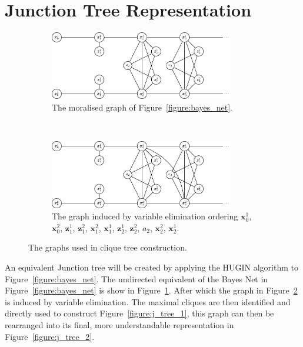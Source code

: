 \section{Junction Tree Representation}
\label{section:junction_tree}
\begin{figure}[!ht]
    \centering
    \begin{subfigure}[t]{0.5\textwidth}
		\centering
		\includegraphics[height = 3cm]{tikz/moralised.pdf}
		\caption[The equivalent Markov Network.]{The moralised graph of Figure~\ref{figure:bayes_net}.}
		\label{figure:moralised}
    \end{subfigure}%
  	~
    \centering
    \begin{subfigure}[t]{0.5\textwidth}
		\centering
		\includegraphics[height = 3cm]{tikz/induced.pdf}
		\caption[The graph induced by variable elimination.]{The graph induced by variable elimination ordering $\pmb{x}_{0}^{1}$, $\pmb{x}_{0}^{2}$, $\pmb{z}_{1}^{1}$, 			$\pmb{z}_{1}^{2}$, $\pmb{x}_{1}^{2}$, $\pmb{x}_{1}^{1}$, $\pmb{z}_{2}^{1}$, $\pmb{z}_{2}^{2}$, $a_{2}$, $\pmb{x}_{2}^{2}$, $\pmb{x}_{2}^{1}$.}
		\label{figure:induced}
    \end{subfigure}%
   	\caption{The graphs used in clique tree construction.}
    \label{figure:markov_moralised}
\end{figure}

An equivalent Junction tree will be created by applying the HUGIN algorithm to Figure~\ref{figure:bayes_net}. The undirected equivalent of the Bayes Net in Figure~\ref{figure:bayes_net} is show in Figure~\ref{figure:moralised}. After which the graph in Figure~\ref{figure:induced} is induced by variable elimination. The maximal cliques are then identified and directly used to construct Figure~\ref{figure:j_tree_1}, this graph can then be rearranged into its final, more understandable representation in Figure~\ref{figure:j_tree_2}.

